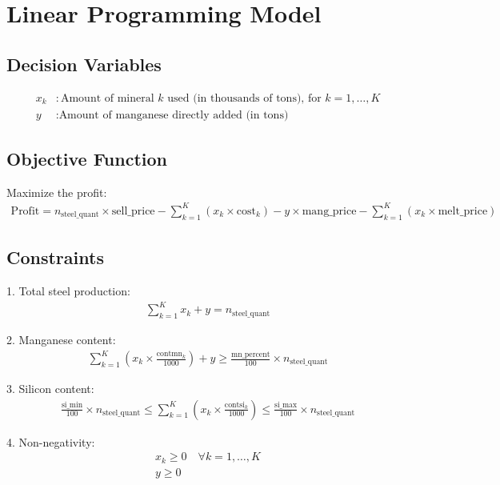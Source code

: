 \documentclass{article}
\begin{document}
\section*{Linear Programming Model}

\subsection*{Decision Variables}
\begin{align*}
x_k &: \text{Amount of mineral } k \text{ used (in thousands of tons), for } k = 1, \ldots, K \\
y &: \text{Amount of manganese directly added (in tons)}
\end{align*}

\subsection*{Objective Function}
Maximize the profit:
\begin{align*}
\text{Profit} = n_{\text{steel\_quant}} \times \text{sell\_price} - \sum_{k=1}^{K} \left( x_k \times \text{cost}_k \right) - y \times \text{mang\_price} - \sum_{k=1}^{K} \left( x_k \times \text{melt\_price} \right)
\end{align*}

\subsection*{Constraints}
1. Total steel production:
\begin{align*}
\sum_{k=1}^{K} x_k + y = n_{\text{steel\_quant}}
\end{align*}

2. Manganese content:
\begin{align*}
\sum_{k=1}^{K} \left( x_k \times \frac{\text{contmn}_k}{1000} \right) + y \geq \frac{\text{mn\_percent}}{100} \times n_{\text{steel\_quant}}
\end{align*}

3. Silicon content:
\begin{align*}
\frac{\text{si\_min}}{100} \times n_{\text{steel\_quant}} \leq \sum_{k=1}^{K} \left( x_k \times \frac{\text{contsi}_k}{1000} \right) \leq \frac{\text{si\_max}}{100} \times n_{\text{steel\_quant}}
\end{align*}

4. Non-negativity:
\begin{align*}
x_k \geq 0 \quad \forall k = 1, \ldots, K \\
y \geq 0
\end{align*}
\end{document}
